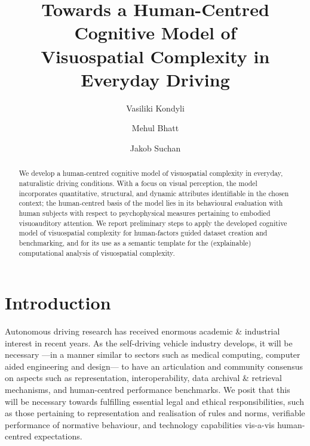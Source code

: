\documentclass[a4paper]{article}
\title{{\sffamily\Large Towards a Human-Centred Cognitive Model of\\Visuospatial Complexity in Everyday Driving}}
\author{
{\normalsize Vasiliki Kondyli}
\and
{\normalsize Mehul Bhatt}
\and
{\normalsize Jakob Suchan}
}
\begin{document}
\maketitle





 


\begin{abstract}{\small\sffamily

We develop a human-centred cognitive model of visuospatial complexity in everyday, naturalistic driving conditions. With a focus on visual perception, the model incorporates quantitative, structural, and dynamic attributes identifiable in the chosen context; the human-centred basis of the model lies in its behavioural evaluation with human subjects with respect to psychophysical measures pertaining to embodied visuoauditory attention. We report preliminary steps to apply the developed cognitive model of visuospatial complexity for human-factors guided dataset creation and benchmarking, and for its use as a semantic template for the (explainable) computational analysis of visuospatial complexity.

}
\end{abstract}



\smallskip

\section{{\sffamily Introduction}}
Autonomous driving research has received enormous academic \& industrial interest in recent years. As the self-driving vehicle industry develops, it will be necessary ---in a manner similar to sectors such as medical computing, computer aided engineering and design--- to have an articulation and community consensus on aspects such as representation, interoperability, data archival \& retrieval mechanisms, and human-centred performance benchmarks. We posit that this will be necessary towards fulfilling essential legal and ethical responsibilities, such as those pertaining to representation and realisation of rules and norms, verifiable performance  of normative behaviour, and technology capabilities vis-a-vis human-centred expectations.

\smallskip
\end{document}
